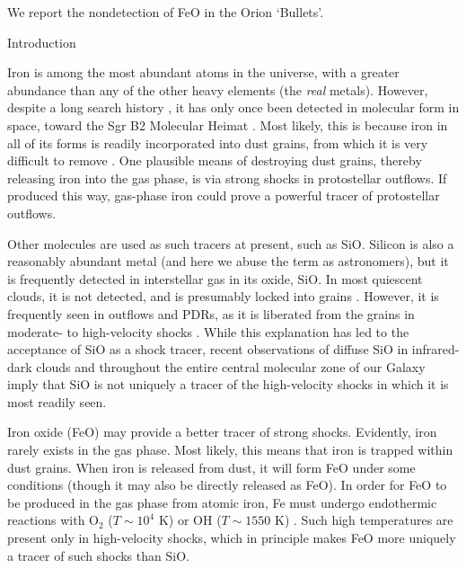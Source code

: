 We report the nondetection of FeO in the Orion `Bullets'.

Introduction

Iron is among the most abundant atoms in the universe, with a greater abundance
than any of the other heavy elements (the \emph{real} metals).  However,
despite a long search history \citep{Merer1982a}, it has only once been
detected in molecular form in space, toward the Sgr B2 Molecular Heimat
\citep{Walmsley2002a,Furuya2003a}.  Most likely, this is because iron in all of
its forms is readily incorporated into dust grains, from which it is very
difficult to remove \citep{Silvia2012a,Nozawa2003a}.  One plausible means
of destroying dust grains, thereby releasing iron into the gas phase, is
via strong shocks in protostellar outflows.  If produced this way, gas-phase
iron could prove a powerful tracer of protostellar outflows.

Other molecules are used as such tracers at present, such as SiO.  Silicon is
also a reasonably abundant metal (and here we abuse the term as astronomers),
but it is frequently detected in interstellar gas in its oxide, SiO.  In most
quiescent clouds, it is not detected, and is presumably locked into grains
\citep{Ziurys1989a}.  However, it is frequently seen in outflows and PDRs, as
it is liberated from the grains in moderate- to high-velocity shocks
\citep[$v_s>10$
\kms;][]{Schilke1997a,Schilke2001a,Jimenez-Serra2008a,Anderl2013a,Gusdorf2008a,Gusdorf2008b}.
While this explanation has led to the acceptance of SiO as a shock tracer,
recent observations of diffuse SiO in infrared-dark clouds
\citep{Jimenez-Serra2010a} and throughout the entire central molecular zone of
our Galaxy \citep{Jones2012a} imply that SiO is not uniquely a tracer of the
high-velocity shocks in which it is most readily seen.

Iron oxide (FeO) may provide a better tracer of strong shocks.  Evidently, iron
rarely exists in the gas phase.  Most likely, this means that iron is trapped
within dust grains.  When iron is released from dust, it will form FeO under
some conditions (though it may also be directly released as FeO).  In order for
FeO to be produced in the gas phase from atomic iron, Fe must undergo
endothermic reactions with O$_2$ ($T\sim10^4$ K) or OH ($T\sim1550$ K)
\citep{Walmsley2002a}. Such high temperatures are present only in high-velocity
shocks, which in principle makes FeO more uniquely a tracer of such shocks
than SiO.


